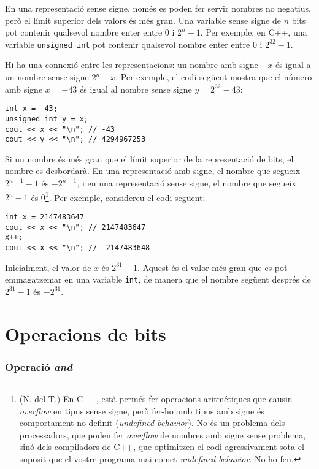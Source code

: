 En una representació sense signe, només es poden fer servir nombres no
negatius, però el límit superior dels valors és més gran. Una variable
sense signe de $n$ bits pot contenir qualsevol nombre enter entre $0$
i $2^n-1$. Per exemple, en C++, una variable \texttt{unsigned int} pot
contenir qualsevol nombre enter entre $0$ i $2^{32}-1$.

Hi ha una connexió entre les representacions: un nombre amb signe $-x$ és
igual a un nombre sense signe $2^n-x$. Per exemple, el codi següent
mostra que el número amb signe $x=-43$ és igual al nombre sense signe
$y=2^{32}-43$:
\begin{lstlisting}
int x = -43;
unsigned int y = x;
cout << x << "\n"; // -43
cout << y << "\n"; // 4294967253
\end{lstlisting}


Si un nombre és més gran que el límit superior de la representació de
bits, el nombre es desbordarà. En una representació amb signe, el
nombre que segueix $2^{n-1}-1$ és $-2^{n-1}$, i en una representació
sense signe, el nombre que segueix $2^n-1$ és $0$\footnote{(N. del T.)
En C++, està permés fer operacions aritmétiques que causin
\emph{overflow} en tipus sense signe, però fer-ho amb tipus amb signe
és comportament no definit (\emph{undefined behavior}). No és un
problema dels processadors, que poden fer \emph{overflow} de nombres
amb signe sense problema, sinó dels compiladors de C++, que optimitzen
el codi agressivament sota el suposit que el vostre programa mai comet
\emph{undefined behavior}. No ho feu.}. Per exemple, considereu el
codi següent:
\begin{lstlisting}
int x = 2147483647
cout << x << "\n"; // 2147483647
x++;
cout << x << "\n"; // -2147483648
\end{lstlisting}

Inicialment, el valor de $x$ és $2^{31}-1$. Aquest és el valor més
gran que es pot emmagatzemar en una variable \texttt{int}, de manera
que el nombre següent després de $2^{31}-1$ és $-2^{31}$.



\section{Operacions de bits}

\newcommand\XOR{\mathbin{\char`\^}}

\subsubsection{Operació \emph{and}}


